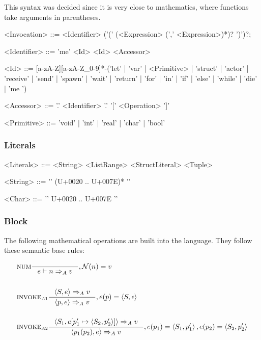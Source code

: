 This syntax was decided since it is very close to mathematics, where functions take arguments in parentheses.
\begin{grammar}
<Invocation> ::= <Identifier> ('(' (<Expression> (',' <Expression>)*)? ')')?;

<Identifier> ::= 'me'
 \alt <Id>
 \alt <Id> <Accessor>

<Id> ::= [a-zA-Z][a-zA-Z\_0-9]*-('let' | 'var' | <Primitive> | 'struct' | 'actor' | 'receive' | 'send' | 'spawn' | 'wait' | 'return' | 'for' | 'in' | 'if' | 'else' | 'while' | 'die' | 'me ')

<Accessor> ::= '.' <Identifier>
 \alt '.' '[' <Operation> ']'

<Primitive> ::= 'void' | 'int' | 'real' | 'char' | 'bool'
\end{grammar}

\subsubsection{Literals}

\begin{grammar}
<Literals> ::= <String>
 \alt <ListRange>
 \alt <StructLiteral>
 \alt <Tuple>

<String> ::= '\textquotedbl' (U+0020 .. U+007E)* '\textquotedbl'

<Char> ::= '\textquotesingle' U+0020 .. U+007E '\textquotesingle'
\end{grammar}

\subsubsection{Block}
The following mathematical operations are built into the language. They follow these semantic base rules:

\begin{align*}
&\inference[NUM]{}
                  {e \vdash n \Rightarrow_A v}
                  {, \mathcal{N}(n) = v}
\\\\
&\inference[$\text{INVOKE}_{A1}$]{\Braket{S,e} \Rightarrow_A v}
                  {\Braket{p,e} \Rightarrow_A v}
                  {,e(p) = \Braket{S,\epsilon}}
\\\\
&\inference[$\text{INVOKE}_{A2}$]{\Braket{S_1,e[p_1' \mapsto \Braket{S_2,p_2'}]} \Rightarrow_A v}
                  {\Braket{p_1(p_2),e} \Rightarrow_A v}
                  {,e(p_1) = \Braket{S_1,p_1'}, e(p_2) = \Braket{S_2,p_2'}}
\\\\
\end{align*}


